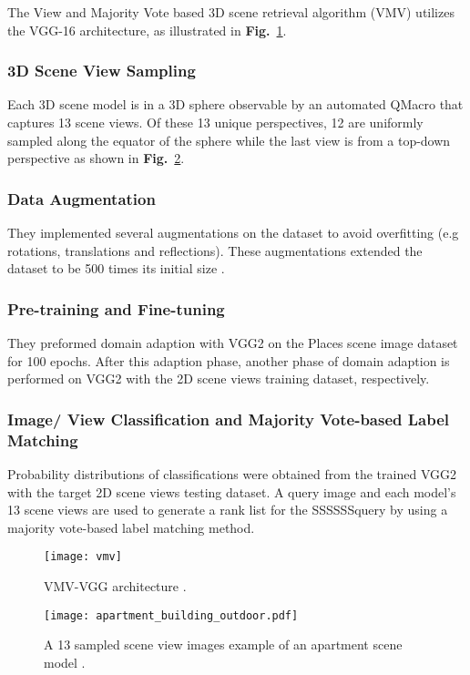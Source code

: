 \documentclass[../main.tex]{subfiles}
\begin{document}
	
The View and Majority Vote based 3D scene retrieval algorithm (VMV) utilizes the VGG-16 architecture, as illustrated in \textbf{Fig.}~\ref{SHREC19}. 

\subsubsection{3D Scene View Sampling}
Each 3D scene model is in a 3D sphere observable by an automated QMacro that captures 13 scene views. Of these 13 unique perspectives, 12 are uniformly sampled along the equator of the sphere while the last view is from a top-down perspective as shown in \textbf{Fig.}~\ref{apartment_building_outdoor}.


\subsubsection{Data Augmentation}
They implemented several augmentations on the dataset to avoid overfitting (e.g rotations, translations and reflections). These augmentations extended the dataset to be 500 times its initial size \cite{3DICPR}. 


\subsubsection{Pre-training and Fine-tuning}   
They preformed domain adaption with VGG2 on the Places scene image dataset \cite{zhou2017places} for 100 epochs. After this adaption phase, another phase of domain adaption is performed on VGG2 with the 2D scene views training dataset, respectively.

\subsubsection{Image/ View Classification and Majority Vote-based Label Matching}
Probability distributions of classifications were obtained from the trained VGG2 with the target 2D scene views testing dataset. A query image and each model's 13 scene views are used to generate a rank list for the SSSSSSquery by using a majority vote-based label matching method.

\begin{figure}[!htp]
\centering
{
\texttt{[image: vmv]}
}
\caption{VMV-VGG architecture \cite{MIPR}.}
\label{SHREC19}
\end{figure}

\begin{figure}[!htp]
\centering
{
\texttt{[image: apartment\_building\_outdoor.pdf]}
}
\caption{A 13 sampled scene view images example of an apartment scene model \cite{MIPR}.}
\label{apartment_building_outdoor}
\end{figure}
\end{document}
